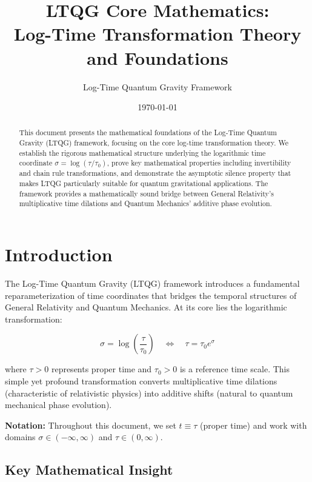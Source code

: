 \documentclass[11pt,a4paper]{article}
\title{\textbf{LTQG Core Mathematics:\\
Log-Time Transformation Theory and Foundations}}
\author{Log-Time Quantum Gravity Framework}
\date{\today}
\begin{document}
\maketitle

\begin{abstract}
This document presents the mathematical foundations of the Log-Time Quantum Gravity (LTQG) framework, focusing on the core log-time transformation theory. We establish the rigorous mathematical structure underlying the logarithmic time coordinate $\sigma = \log(\tau/\tau_0)$, prove key mathematical properties including invertibility and chain rule transformations, and demonstrate the asymptotic silence property that makes LTQG particularly suitable for quantum gravitational applications. The framework provides a mathematically sound bridge between General Relativity's multiplicative time dilations and Quantum Mechanics' additive phase evolution.
\end{abstract}

\tableofcontents
\newpage

\section{Introduction}

The Log-Time Quantum Gravity (LTQG) framework introduces a fundamental reparameterization of time coordinates that bridges the temporal structures of General Relativity and Quantum Mechanics. At its core lies the logarithmic transformation:

\begin{equation}
\sigma = \log\left(\frac{\tau}{\tau_0}\right) \quad \Leftrightarrow \quad \tau = \tau_0 e^{\sigma}
\end{equation}

where $\tau > 0$ represents proper time and $\tau_0 > 0$ is a reference time scale. This simple yet profound transformation converts multiplicative time dilations (characteristic of relativistic physics) into additive shifts (natural to quantum mechanical phase evolution).

\textbf{Notation:} Throughout this document, we set $t \equiv \tau$ (proper time) and work with domains $\sigma \in (-\infty, \infty)$ and $\tau \in (0, \infty)$.

\subsection{Key Mathematical Insight}
\end{document}
